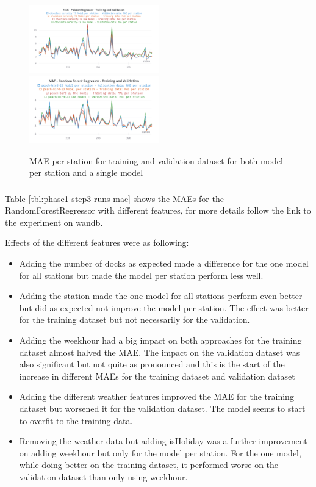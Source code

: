 \documentclass[a4paper]{article}
\begin{document}
    \begin{figure}[h]
        \includegraphics[width=0.5\textwidth]{mae-pr-perstation}\hfill
        \includegraphics[width=0.5\textwidth]{mae-rfr-comparison}
        \caption{MAE per station for training and validation dataset for both model per station and a single model}
        \label{fig:simple-pr-rfr-mae-perstation}
    \end{figure}


    \subsubsection*{}

    Table \ref{tbl:phase1-step3-runs-mae} shows the MAEs for the RandomForestRegressor with different features, for more
    details follow the link to the experiment on wandb.

    Effects of the different features were as following:
    \begin{itemize}
        \item  Adding the number of docks as expected made a difference for
        the one model for all stations but made the model per station perform less well.
        \item Adding the station made the one model for all stations perform even better but did as expected not improve
        the model per station. The effect was better for the training dataset but not necessarily for the validation.
        \item Adding the weekhour had a big impact on both approaches for the training dataset almost halved the MAE.
        The impact on the validation dataset was also significant but not quite as pronounced and this is the start of the
        increase in different MAEs for the training dataset and validation dataset
        \item Adding the different weather features improved the MAE for the training dataset but worsened it for the validation
        dataset. The model seems to start to overfit to the training data.
        \item Removing the weather data but adding isHoliday was a further improvement on adding weekhour but only for the model
        per station. For the one model, while doing better on the training dataset, it performed worse on the validation dataset
        than only using weekhour.
    \end{itemize}
\end{document}
